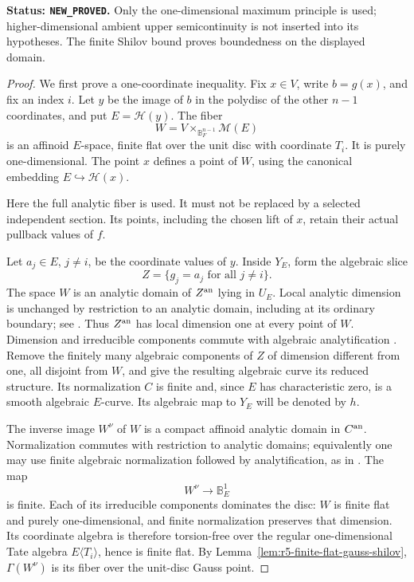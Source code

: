 \documentclass[11pt,a4paper]{article}
\numberwithin{equation}{section}
\theoremstyle{definition}
\theoremstyle{remark}
\begin{document}
\noindent\textbf{Status: \texttt{NEW\_PROVED}.}
Only the one-dimensional maximum principle is used; higher-dimensional
ambient upper semicontinuity is not inserted into its hypotheses.
The finite Shilov bound proves boundedness on the displayed domain.

\begin{proof}
We first prove a one-coordinate inequality.  Fix $x\in V$, write
$b=g(x)$, and fix an index $i$.  Let $y$ be the image of $b$ in
the polydisc of the other $n-1$ coordinates, and put
$E=\mathscr H(y)$.  The fiber
\[
 W=V\times_{\mathbb B_F^{n-1}}\mathcal M(E)
\]
is an affinoid $E$-space, finite flat over the unit disc with
coordinate $T_i$.  It is purely one-dimensional.  The point $x$
defines a point of $W$, using the canonical embedding
$E\hookrightarrow\mathscr H(x)$.

Here the full analytic fiber is used.  It must not be replaced by
a selected independent section.  Its points, including the chosen
lift of $x$, retain their actual pullback values of $f$.

Let $a_j\in E$, $j\ne i$, be the coordinate values of $y$.
Inside $Y_E$, form the algebraic slice
\[
                 Z=\{g_j=a_j\text{ for all }j\ne i\}.
\]
The space $W$ is an analytic domain of $Z^{\rm an}$ lying in
$U_E$.  Local analytic dimension is unchanged by restriction to
an analytic domain, including at its ordinary boundary; see
\cite[\S1.4.9]{DucrosFamilies}.  Thus $Z^{\rm an}$ has local
dimension one at every point of $W$.  Dimension and irreducible
components commute with algebraic analytification
\cite[Propositions 2.7.7(2) and 2.7.16]{DucrosFamilies}.
Remove the finitely many algebraic components of $Z$ of dimension
different from one, all disjoint from $W$, and give the resulting
algebraic curve its reduced structure.  Its normalization $C$ is
finite and, since $E$ has characteristic zero, is a smooth
algebraic $E$-curve.  Its algebraic map to $Y_E$ will be denoted
by $h$.

The inverse image $W^\nu$ of $W$ is a compact affinoid analytic
domain in $C^{\rm an}$.  Normalization commutes with restriction
to analytic domains; equivalently one may use finite algebraic
normalization followed by analytification, as in
\cite[Lemma 2.7.15]{DucrosFamilies}.  The map
\[
                     W^\nu\longrightarrow\mathbb B_E^1
\]
is finite.  Each of its irreducible components dominates the
disc: $W$ is finite flat and purely one-dimensional, and finite
normalization preserves that dimension.  Its coordinate algebra
is therefore torsion-free over the regular one-dimensional Tate
algebra $E\langle T_i\rangle$, hence is finite flat.  By
Lemma~\ref{lem:r5-finite-flat-gauss-shilov},
$\Gamma(W^\nu)$ is its fiber over the unit-disc Gauss point.


\end{proof}
\end{document}
